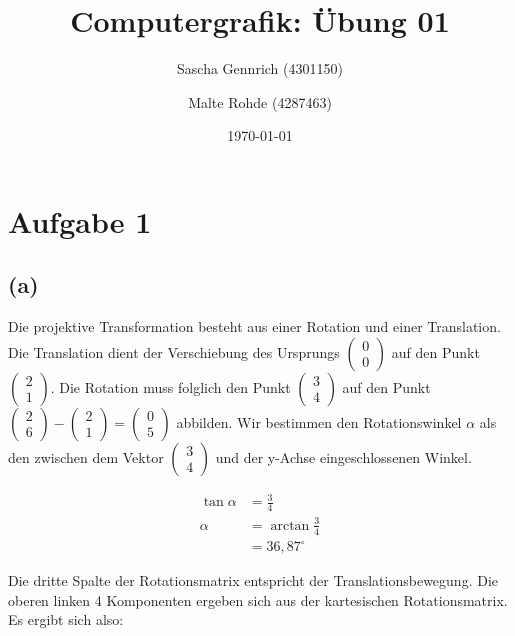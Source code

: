 \documentclass[a4paper]{scrartcl}
\title{Computergrafik: Übung 01}
\author{Sascha Gennrich (4301150) \and Malte Rohde (4287463)}
\date{\today{}}
\begin{document}
\maketitle

\section*{Aufgabe 1}
\subsection*{(a)}
Die projektive Transformation besteht aus einer Rotation und einer Translation. Die Translation dient der Verschiebung des Ursprungs $\left(\begin{matrix} 0 \\ 0 \end{matrix}\right)$ auf den Punkt $\left(\begin{matrix} 2 \\ 1 \end{matrix}\right)$. Die Rotation muss folglich den Punkt $\left(\begin{matrix} 3 \\ 4 \end{matrix}\right)$ auf den Punkt $\left(\begin{matrix} 2 \\ 6 \end{matrix}\right) - \left(\begin{matrix} 2 \\ 1 \end{matrix}\right) = \left(\begin{matrix} 0 \\ 5 \end{matrix}\right)$ abbilden. Wir bestimmen den Rotationswinkel $\alpha$ als den zwischen dem Vektor $\left(\begin{matrix} 3 \\ 4 \end{matrix}\right)$ und der y-Achse eingeschlossenen Winkel.

\begin{align*}
\tan\alpha& = \frac{3}{4} \\
\alpha& = \arctan{\frac{3}{4}} \\
& = 36,87^\circ
\end{align*}

Die dritte Spalte der Rotationsmatrix entspricht der Translationsbewegung. Die oberen linken 4 Komponenten ergeben sich aus der kartesischen Rotationsmatrix. Es ergibt sich also: 
\end{document}

